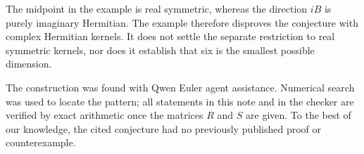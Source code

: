 \documentclass[11pt]{article}
\begin{document}
The midpoint in the example is real symmetric, whereas the direction $iB$ is
purely imaginary Hermitian.  The example therefore disproves the conjecture
with complex Hermitian kernels.  It does not settle the separate restriction
to real symmetric kernels, nor does it establish that six is the smallest
possible dimension.

The construction was found with Qwen Euler agent assistance.  Numerical search
was used to locate the pattern; all statements in this note and in the checker
are verified by exact arithmetic once the matrices $R$ and $S$ are given.
To the best of our knowledge, the cited conjecture had no previously published
proof or counterexample.



\end{document}
